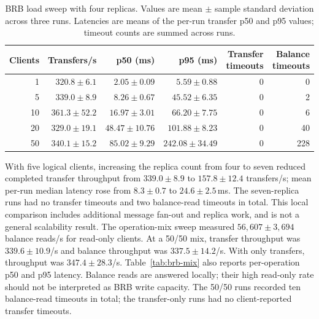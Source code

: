 \documentclass[sigconf,a4paper]{acmart}
\begin{document}
    \begin{table}[t]
        \centering
        \scriptsize
        \caption{BRB load sweep with four replicas. Values are mean $\pm$
        sample standard deviation across three runs. Latencies are means of the
        per-run transfer p50 and p95 values; timeout counts are summed across
        runs.}
        \label{tab:brb-load}
        \begin{tabular}{r r r r r r}
            \toprule
            \textbf{Clients} & \textbf{Transfers/s} & \textbf{p50 (ms)} &
            \textbf{p95 (ms)} & \textbf{Transfer timeouts} &
            \textbf{Balance timeouts} \\
            \midrule
            1  & $320.8\pm6.1$    & $2.05\pm0.09$   & $5.59\pm0.88$ & 0 & 0 \\
            5  & $339.0\pm8.9$    & $8.26\pm0.67$   & $45.52\pm6.35$ & 0 & 2 \\
            10 & $361.3\pm52.2$   & $16.97\pm3.01$  & $66.20\pm7.75$ & 0 & 6 \\
            20 & $329.0\pm19.1$   & $48.47\pm10.76$ & $101.88\pm8.23$ & 0 & 40 \\
            50 & $340.1\pm15.2$   & $85.02\pm9.29$  & $242.08\pm34.49$ & 0 & 228 \\
            \bottomrule
        \end{tabular}
    \end{table}

    With five logical clients, increasing the replica count from four to seven
    reduced completed transfer throughput from $339.0\pm8.9$ to
    $157.8\pm12.4$ transfers/s; mean per-run median latency rose from
    $8.3\pm0.7$ to $24.6\pm2.5$\,ms. The seven-replica runs had no transfer
    timeouts and two balance-read timeouts in total. This local comparison includes additional
    message fan-out and replica work, and is not a general scalability result.
    The operation-mix sweep measured $56{,}607\pm3{,}694$ balance reads/s for
    read-only clients. At a 50/50 mix, transfer throughput was
    $339.6\pm10.9$/s and balance throughput was $337.5\pm14.2$/s. With only
    transfers, throughput was $347.4\pm28.3$/s. Table~\ref{tab:brb-mix} also
    reports per-operation p50 and p95 latency. Balance reads are answered
    locally; their high read-only rate should not be interpreted as BRB write
    capacity. The 50/50 runs recorded ten balance-read timeouts in total; the
    transfer-only runs had no client-reported transfer timeouts.
\end{document}
